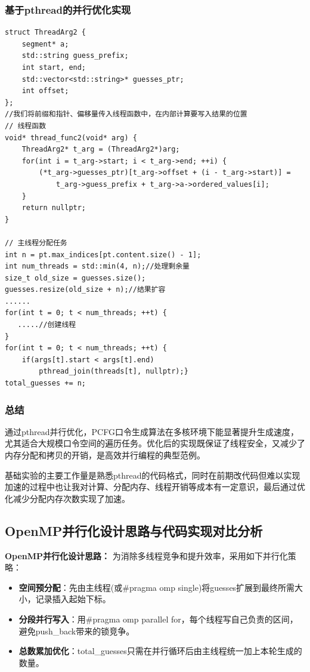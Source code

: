 \documentclass[a4paper]{article}
\begin{document}
\subsubsection{基于pthread的并行优化实现}
\begin{lstlisting}[caption=pthread并行实现关键代码片段]
struct ThreadArg2 {
    segment* a;
    std::string guess_prefix;
    int start, end;
    std::vector<std::string>* guesses_ptr;
    int offset;
};
//我们将前缀和指针、偏移量传入线程函数中，在内部计算要写入结果的位置
// 线程函数
void* thread_func2(void* arg) {
    ThreadArg2* t_arg = (ThreadArg2*)arg;
    for(int i = t_arg->start; i < t_arg->end; ++i) {
        (*t_arg->guesses_ptr)[t_arg->offset + (i - t_arg->start)] = 
            t_arg->guess_prefix + t_arg->a->ordered_values[i];
    }
    return nullptr;
}

// 主线程分配任务
int n = pt.max_indices[pt.content.size() - 1];
int num_threads = std::min(4, n);//处理剩余量
size_t old_size = guesses.size();
guesses.resize(old_size + n);//结果扩容
......
for(int t = 0; t < num_threads; ++t) {
   .....//创建线程
}
for(int t = 0; t < num_threads; ++t) {
    if(args[t].start < args[t].end)
        pthread_join(threads[t], nullptr);}
total_guesses += n;
\end{lstlisting}

\subsubsection{总结}
\par 通过pthread并行优化，PCFG口令生成算法在多核环境下能显著提升生成速度，尤其适合大规模口令空间的遍历任务。优化后的实现既保证了线程安全，又减少了内存分配和拷贝的开销，是高效并行编程的典型范例。
\par 基础实验的主要工作量是熟悉pthread的代码格式，同时在前期改代码但难以实现加速的过程中也让我对计算、分配内存、线程开销等成本有一定意识，最后通过优化减少分配内存次数实现了加速。
\subsection{OpenMP并行化设计思路与代码实现对比分析}
\textbf{OpenMP并行化设计思路：}
为消除多线程竞争和提升效率，采用如下并行化策略：
\begin{itemize}
    \item \textbf{空间预分配}：先由主线程(或\#pragma omp single)将guesses扩展到最终所需大小，记录插入起始下标。
    
    \item \textbf{分段并行写入}：用\#pragma omp parallel for，每个线程写自己负责的区间，避免push\_back带来的锁竞争。
    
    \item \textbf{总数累加优化}：total\_guesses只需在并行循环后由主线程统一加上本轮生成的数量。
\end{itemize}
\end{document}
